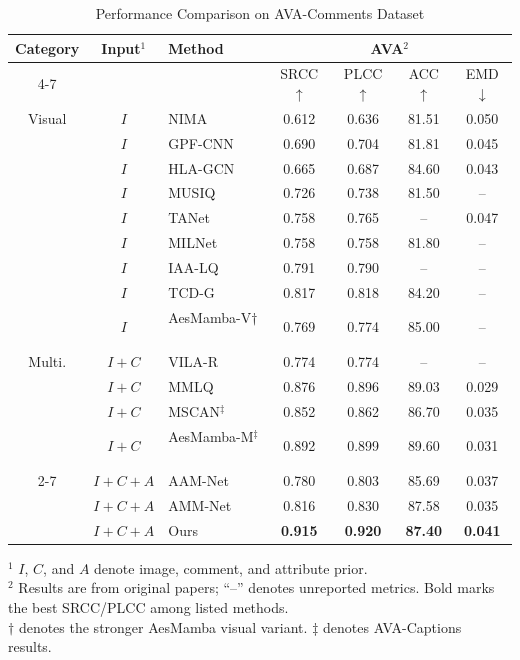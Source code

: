 \documentclass[journal]{IEEEtran}
\begin{document}
\begin{table}[!t]
\caption{Performance Comparison on AVA-Comments Dataset}
\label{tab:main_comparison}
\centering
\scriptsize
\setlength{\tabcolsep}{1.6pt}
\begin{tabular}{c|c|l|cccc}
\hline
Category & Input$^{1}$ & Method & \multicolumn{4}{c}{AVA$^{2}$} \\
\cline{4-7}
 & & & SRCC$\uparrow$ & PLCC$\uparrow$ & ACC$\uparrow$ & EMD$\downarrow$ \\
\hline
Visual & $I$ & NIMA~\cite{talebi2018nima} & 0.612 & 0.636 & 81.51 & 0.050 \\
& $I$ & GPF-CNN~\cite{zhang2019gpfcnn} & 0.690 & 0.704 & 81.81 & 0.045 \\
& $I$ & HLA-GCN~\cite{she2021hlagcn} & 0.665 & 0.687 & 84.60 & 0.043 \\
& $I$ & MUSIQ~\cite{ke2021musiq} & 0.726 & 0.738 & 81.50 & -- \\
& $I$ & TANet~\cite{he2022tanet} & 0.758 & 0.765 & -- & 0.047 \\
& $I$ & MILNet~\cite{shi2024milnet} & 0.758 & 0.758 & 81.80 & -- \\
& $I$ & IAA-LQ~\cite{xiong2023iaalq} & 0.791 & 0.790 & -- & -- \\
& $I$ & TCD-G~\cite{hou2025tcdg} & 0.817 & 0.818 & 84.20 & -- \\
& $I$ & AesMamba-V$\dagger$~\cite{gao2024aesmamba} & 0.769 & 0.774 & 85.00 & -- \\
\hline
Multi. & $I+C$ & VILA-R~\cite{ke2023vila} & 0.774 & 0.774 & -- & -- \\
& $I+C$ & MMLQ~\cite{xiong2024mmlq} & 0.876 & 0.896 & 89.03 & 0.029 \\
& $I+C$ & MSCAN$^{\ddagger}$~\cite{zhang2021mscan} & 0.852 & 0.862 & 86.70 & 0.035 \\
& $I+C$ & AesMamba-M$^{\ddagger}$~\cite{gao2024aesmamba} & 0.892 & 0.899 & 89.60 & 0.031 \\
\cline{2-7}
& $I+C+A$ & AAM-Net~\cite{zhu2023aamnet} & 0.780 & 0.803 & 85.69 & 0.037 \\
& $I+C+A$ & AMM-Net~\cite{li2023ammnet} & 0.816 & 0.830 & 87.58 & 0.035 \\
& $I+C+A$ & Ours & \textbf{0.915} & \textbf{0.920} & \textbf{87.40} & \textbf{0.041} \\
\hline
\end{tabular}
\vspace{2pt}
\begin{flushleft}
\scriptsize
$^{1}$ $I$, $C$, and $A$ denote image, comment, and attribute prior.\\
$^{2}$ Results are from original papers; ``--'' denotes unreported metrics. Bold marks the best SRCC/PLCC among listed methods.\\
$\dagger$ denotes the stronger AesMamba visual variant. $\ddagger$ denotes AVA-Captions~\cite{ghosal2019aesthetic} results.
\end{flushleft}
\end{table}
\end{document}
